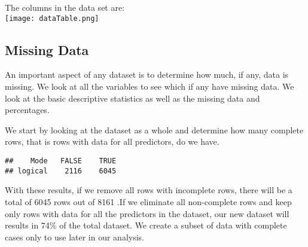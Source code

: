\documentclass[]{article}
\begin{document}
The columns in the data set are:\\
\texttt{[image: dataTable.png]}

\hypertarget{missing-data}{%
\subsection{Missing Data}\label{missing-data}}

An important aspect of any dataset is to determine how much, if any,
data is missing. We look at all the variables to see which if any have
missing data. We look at the basic descriptive statistics as well as the
missing data and percentages.

We start by looking at the dataset as a whole and determine how many
complete rows, that is rows with data for all predictors, do we have.

\begin{verbatim}
##    Mode   FALSE    TRUE 
## logical    2116    6045
\end{verbatim}

With these results, if we remove all rows with incomplete rows, there
will be a total of 6045 rows out of 8161 .If we eliminate all
non-complete rows and keep only rows with data for all the predictors in
the dataset, our new dataset will results in 74\% of the total dataset.
We create a subset of data with complete cases only to use later in our
analysis.
\end{document}

